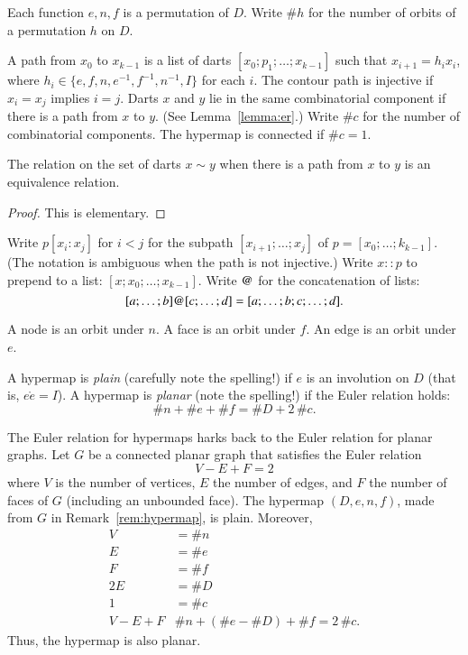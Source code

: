 Each function $e,n,f$ is a permutation of $D$.  Write $\#h$ for the number of orbits of a permutation $h$ on $D$.

\begin{definition}  A path from $x_0$ to $x_{k-1}$ is a list of darts $[x_0;p_1;\ldots;x_{k-1}]$ such that $x_{i+1} = h_i x_i$, where $h_i \in \{e,f,n,e^{-1},f^{-1},n^{-1},I\}$ for each $i$.   The contour path is injective if $x_i=x_j$ implies $i=j$. Darts $x$ and $y$ lie in the same combinatorial component if there is a path from $x$ to $y$. (See Lemma~\ref{lemma:er}.)  Write $\#c$ for the number of combinatorial components.  The hypermap is connected if $\#c=1$.
\end{definition}

\begin{lemma}\label{lemma:er} The relation on the set of darts $x\sim y$ when there is a path from $x$ to $y$ is an equivalence relation.
\end{lemma}

\begin{proof} This is elementary.
\end{proof}

Write  $p[x_i:x_j]$ for $i<j$ for the subpath $[x_{i+1};\ldots;x_j]$ of $p=[x_0;\ldots;k_{k-1}]$.  (The notation is ambiguous when the path is not injective.)  Write $x::p$ to prepend to a list: $[x;x_0;\ldots;x_{k-1}]$.  Write ${\operatorname{@}}$ for the concatenation of lists:
$$
[a;\ldots;b] {\operatorname{@}} [c;\ldots;d]  = [a;\ldots;b;c;\ldots;d].
$$


\begin{definition}  A node is an orbit  under $n$.  A face is an  orbit  under $f$.  An edge is an orbit under $e$. 
\end{definition}

\begin{definition} A hypermap is {\it plain} (carefully note the spelling!) if
$e$ is an involution on $D$ (that is, $e\ocirc e = I$).  A hypermap
is {\it planar} (note the spelling!) if the Euler relation holds:
    $$\# n + \# e + \# f = \# D + 2\, \#c.$$
\end{definition}


\begin{remark}\label{rem:Euler}  The Euler relation for hypermaps harks back
to the Euler relation for planar graphs.
Let $G$ be a connected planar graph that satisfies the
Euler relation
    $$V - E + F = 2$$
where $V$ is the number of vertices, $E$ the number of edges, and
$F$ the number of faces of $G$ (including an unbounded face). The
hypermap $(D,e,n,f)$, made from $G$ in
Remark~\ref{rem:hypermap}, is plain.
Moreover,
    $$\begin{array}{lll}
    V &= \# n\\
    E &= \# e\\
    F &= \# f\\
    2E &= \# D\\
    1 &= \#c\\
    V - E + F  &\# n + (\#e - \#D) + \# f = 2\,\# c.
    \end{array}
    $$
Thus, the hypermap is also planar. 
\end{remark}


